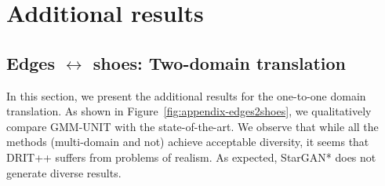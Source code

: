 \documentclass[runningheads]{llncs}
\begin{document}
\section{Additional results}
\subsection{Edges $\leftrightarrow$ shoes: Two-domain translation}
\label{sec:appendix_edgesshoes}
In this section, we present the additional results for the one-to-one domain translation. As shown in Figure~\ref{fig:appendix-edges2shoes}, we qualitatively compare GMM-UNIT with the state-of-the-art. We observe that while all the methods (multi-domain and not) achieve acceptable diversity, it seems that DRIT++ suffers from problems of realism. As expected, StarGAN* does not generate diverse results. 
\end{document}
